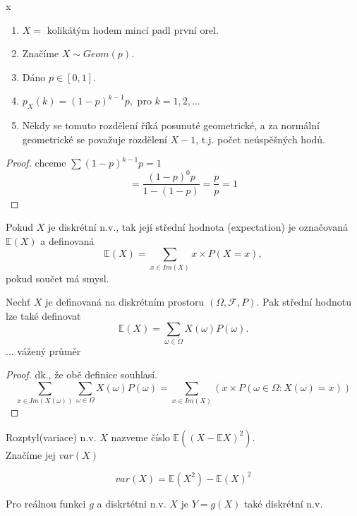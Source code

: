 \documentclass[../main.tex]{subfiles}
\begin{document}
\begin{definition} {\color{white} x}

    \begin{enumerate}
        \item $X =$ kolikátým hodem mincí padl první orel.
        \item Značíme $X \sim Geom(p)$.
        \item Dáno $p\in [0,1]$.
        \item $p_X(k) = (1-p)^{k-1}p,$ pro $k=1,2,\dots$
        \item Někdy se tomuto rozdělení říká posunuté geometrické, a za normální geometrické
        se považuje rozdělení $X-1$, t.j. počet neúspěšných hodů.
    \end{enumerate}
    \begin{proof}
        chceme $\sum (1-p)^{k-1}p = 1$
        \[= \frac{(1-p)^{0}p}{1- (1-p)} = \frac{p}{p} = 1\]
    \end{proof}
\end{definition}
\begin{definition}
    
    Pokud $X$ je diskrétní n.v., tak její střední hodnota (expectation) je označovaná $\mathbb{E}(X)$ a definovaná
    \[\mathbb{E}(X) = \sum_{x\in Im(X)}x \times P(X=x),\]
    pokud součet má smysl.
    
    Nechť $X$ je definovaná na diskrétním prostoru $(\Omega, \mathcal{F},P)$. Pak střední hodnotu lze také definovat
    \[\mathbb{E}(X) = \sum_{\omega \in \Omega} X(\omega)P({\omega}).\]
    ... vážený průměr 
    \begin{proof}
        dk., že obě definice souhlasí.
        \[\sum_{x\in Im(X(\omega))} \sum_{\omega \in \Omega} X(\omega) P({\omega}) = \sum_{x\in Im(X)}(x\times P({\omega \in \Omega : X(\omega) = x}))\]
    \end{proof}
\end{definition}
\begin{definition}[Rozptyl]

    Rozptyl(variace) n.v. $X$ nazveme číslo $\mathbb{E}((X-\mathbb{E}X)^2)$.\\
    Značíme jej $var(X)$

    \begin{theorem}
    \[var(X) = \mathbb{E}(X^2) - \mathbb{E}(X)^2\]
    \end{theorem}
\end{definition}
\begin{definition}

    Pro reálnou funkci $g$ a diskrtétni n.v. $X$ je $Y = g(X)$ také diskrétní n.v.
\end{definition}
\end{document}
